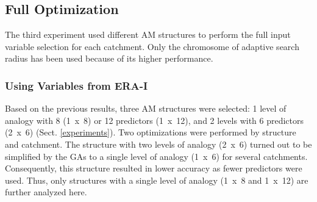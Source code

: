 \documentclass[draft]{agujournal2019}
\begin{document}
\FloatBarrier

\subsection{Full Optimization}
\label{best_multi}

The third experiment used different AM structures to perform the full input variable selection for each catchment. Only the chromosome of adaptive search radius has been used because of its higher performance.

\subsubsection{Using Variables from ERA-I}

Based on the previous results, three AM structures were selected: 1 level of analogy with 8 (1~x~8) or 12 predictors (1~x~12), and 2 levels with 6 predictors (2~x~6) (Sect. \ref{experiments}). Two optimizations were performed by structure and catchment. The structure with two levels of analogy (2~x~6) turned out to be simplified by the GAs to a single level of analogy (1~x~6) for several catchments. Consequently, this structure resulted in lower accuracy as fewer predictors were used. Thus, only structures with a single level of analogy (1~x~8 and 1~x~12) are further analyzed here. 
\end{document}

